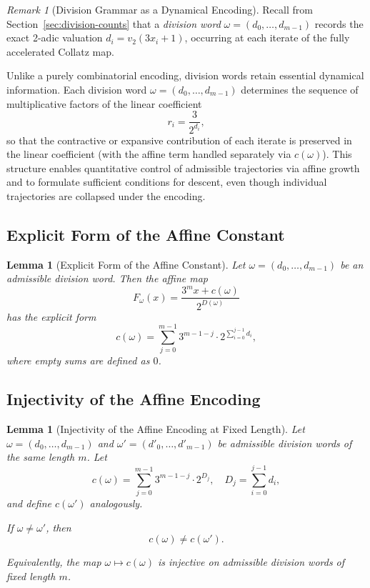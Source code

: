 \documentclass[12pt, oneside]{article}
\numberwithin{equation}{section}
\theoremstyle{definition}
\theoremstyle{plain}
\newtheorem{lemma}[theorem]{Lemma}
\theoremstyle{remark}
\newtheorem*{remark}{Remark}
\begin{document}
\begin{remark}[Division Grammar as a Dynamical Encoding]
Recall from Section~\ref{sec:division-counts} that a \emph{division word}
$\omega=(d_0,\dots,d_{m-1})$ records the exact 2-adic valuation
$d_i = v_2(3 x_i + 1)$, occurring at each iterate of the fully accelerated
Collatz map.

Unlike a purely combinatorial encoding, division words retain essential
dynamical information. Each division word $\omega=(d_0,\dots,d_{m-1})$
determines the sequence of multiplicative factors of the linear coefficient
\[
r_i = \frac{3}{2^{d_i}},
\]
so that the contractive or expansive contribution of each iterate is
preserved in the linear coefficient (with the affine term handled separately
via $c(\omega)$). This structure enables quantitative control of admissible
trajectories via affine growth and to formulate sufficient conditions for
descent, even though individual trajectories are collapsed under the encoding.
\end{remark}

\subsection{Explicit Form of the Affine Constant}
\begin{lemma}[Explicit Form of the Affine Constant]
Let $\omega = (d_0,\dots,d_{m-1})$ be an admissible division word.  
Then the affine map
\[
F_\omega(x) = \frac{3^m x + c(\omega)}{2^{D(\omega)}}
\]
has the explicit form
\[
c(\omega)
=
\sum_{j=0}^{m-1}
3^{m-1-j}\cdot 2^{\sum_{i=0}^{j-1} d_i},
\]
where empty sums are defined as $0$.
\end{lemma}

\subsection{Injectivity of the Affine Encoding}
\begin{lemma}[Injectivity of the Affine Encoding at Fixed Length]
\label{lem:injectivity}
Let $\omega = (d_0,\dots,d_{m-1})$ and $\omega' = (d'_0,\dots,d'_{m-1})$
be admissible division words of the same length $m$. Let
\[
c(\omega)
=
\sum_{j=0}^{m-1}
3^{m-1-j}\cdot 2^{D_j},
\quad
D_j = \sum_{i=0}^{j-1} d_i,
\]
and define $c(\omega')$ analogously.

If $\omega \ne \omega'$, then
\[
c(\omega) \ne c(\omega').
\]

Equivalently, the map $\omega \mapsto c(\omega)$ is injective on admissible
division words of fixed length $m$.
\end{lemma}
\end{document}

